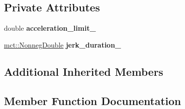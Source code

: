 \subsection*{Private Attributes}
\begin{DoxyCompactItemize}
\item 
double {\bfseries acceleration\+\_\+limit\+\_\+}\hypertarget{classmct_1_1LinearDynamicsWithAccelerationConstraint_a8030e84817471fde3716a5d4ea4f2927}{}\label{classmct_1_1LinearDynamicsWithAccelerationConstraint_a8030e84817471fde3716a5d4ea4f2927}

\item 
\hyperlink{classmct_1_1NonnegDouble}{mct\+::\+Nonneg\+Double} {\bfseries jerk\+\_\+duration\+\_\+}\hypertarget{classmct_1_1LinearDynamicsWithAccelerationConstraint_ad5f33b779d2503eca2a7bb1f53ccc0da}{}\label{classmct_1_1LinearDynamicsWithAccelerationConstraint_ad5f33b779d2503eca2a7bb1f53ccc0da}

\end{DoxyCompactItemize}
\subsection*{Additional Inherited Members}


\subsection{Member Function Documentation}
